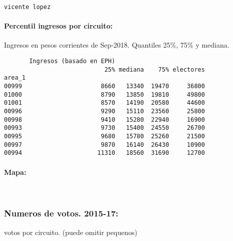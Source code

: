 \documentclass[11pt]{article}
\begin{document}
    
    \begin{Verbatim}[commandchars=\\\{\}]
vicente lopez

    \end{Verbatim}

    \hypertarget{percentil-ingresos-por-circuito}{%
\paragraph{Percentil ingresos por
circuito:}\label{percentil-ingresos-por-circuito}}

    
    Ingresos en pesos corrientes de Sep-2018. Quantiles 25\%, 75\% y
mediana.

    
    
    \begin{verbatim}
       Ingresos (basado en EPH)                         
                            25% mediana    75% electores
area_1                                                  
00999                      8660   13340  19470     36800
01000                      8790   13850  19810     49800
01001                      8570   14190  20580     44600
00996                      9290   15110  23560     25800
00998                      9410   15280  22940     16900
00993                      9730   15400  24550     26700
00995                      9680   15780  25260     21500
00997                      9870   16140  26430     10900
00994                     11310   18560  31690     12700
    \end{verbatim}

    
    \hypertarget{mapa}{%
\paragraph{Mapa:}\label{mapa}}

    
    \begin{center}
    \end{center}
    { \hspace*{\fill} \\}
    
    \hypertarget{numeros-de-votos.-2015-17}{%
\subsubsection{Numeros de votos.
2015-17:}\label{numeros-de-votos.-2015-17}}

    
    votos por circuito. (puede omitir pequenos)
\end{document}
